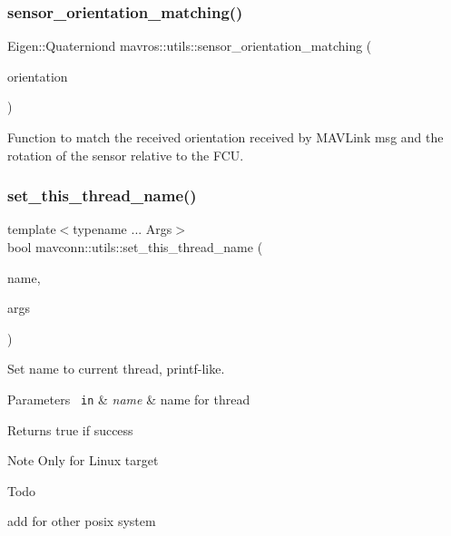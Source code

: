 \subsubsection{\texorpdfstring{sensor\_orientation\_matching()}{sensor\_orientation\_matching()}}
{\footnotesize\ttfamily Eigen\+::\+Quaterniond mavros\+::utils\+::sensor\+\_\+orientation\+\_\+matching (\begin{DoxyParamCaption}\item[{mavlink\+::common\+::\+M\+A\+V\+\_\+\+S\+E\+N\+S\+O\+R\+\_\+\+O\+R\+I\+E\+N\+T\+A\+T\+I\+ON}]{orientation }\end{DoxyParamCaption})}



Function to match the received orientation received by M\+A\+V\+Link msg and the rotation of the sensor relative to the F\+CU. 

\mbox{\label{group__mavutils_gac5ea11f12ae2183df1dc4a810ff0a87b}} 
\subsubsection{\texorpdfstring{set\_this\_thread\_name()}{set\_this\_thread\_name()}}
{\footnotesize\ttfamily template$<$typename ... Args$>$ \\
bool mavconn\+::utils\+::set\+\_\+this\+\_\+thread\+\_\+name (\begin{DoxyParamCaption}\item[{const std\+::string \&}]{name,  }\item[{Args \&\&...}]{args }\end{DoxyParamCaption})}



Set name to current thread, printf-\/like. 


\begin{DoxyParams}[1]{Parameters}
\mbox{\texttt{ in}}  & {\em name} & name for thread \\
\hline
\end{DoxyParams}
\begin{DoxyReturn}{Returns}
true if success
\end{DoxyReturn}
\begin{DoxyNote}{Note}
Only for Linux target 
\end{DoxyNote}
\begin{DoxyRefDesc}{Todo}
\item[\mbox{\hyperlink{todo__todo000001}{Todo}}]add for other posix system \end{DoxyRefDesc}


